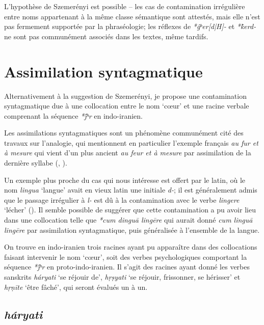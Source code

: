 \documentclass{article}
\newcommand{\ipa}[1]{{\phon\textit{#1}}}
\begin{document}
L'hypothèse de Szemerényi est possible -- les cas de contamination irrégulière entre noms appartenant à la même classe sémantique sont attestés, mais elle n'est pas fermement supportée par la phraséologie; les réflexes de \ipa{*ĝʰer[d|H]-} et \ipa{*k̂erd-} ne sont pas communément associés dans les textes, même tardifs.

\section{Assimilation syntagmatique}
Alternativement à la suggestion de Szemerényi, je propose une contamination syntagmatique due à une collocation entre le nom `cœur' et une racine verbale comprenant la séquence \ipa{*j́ʰr} en indo-iranien. 

Les assimilations syntagmatiques sont un phénomène communément cité des travaux sur l'analogie, qui mentionnent en particulier l'exemple français \ipa{au fur et à mesure} qui vient d'un plus ancient \ipa{au feur et à mesure} par assimilation de la dernière syllabe (\citealt[16]{andersen80morpho}, \citealt[64]{fertig13analogy}). %

Un exemple plus proche du cas qui nous intéresse est offert par le latin, où le nom \ipa{lingua} `langue' avait en vieux latin une initiale \ipa{d-}; il est généralement admis que le passage irrégulier à \ipa{l-} est dû à la contamination avec le verbe \ipa{lingere} `lécher' (\citealt[304]{hock91principles}). Il semble possible de suggérer que cette contamination a pu avoir lieu dans une collocation telle que \ipa{*cum dinguā lingēre} qui aurait donné \ipa{cum linguā lingēre} par assimilation syntagmatique, puis généralisée à l'ensemble de la langue.
 
On trouve en indo-iranien trois racines ayant pu apparaître dans des collocations faisant intervenir le nom `cœur', soit des verbes psychologiques comportant la séquence \ipa{*j́ʰr} en proto-indo-iranien. Il s'agit des racines ayant donné les verbes sanskrits \ipa{háryati} `se réjouir de', \ipa{hṛṣyati} `se réjouir, frissonner, se hérisser' et \ipa{hṛṇīte} `être fâché', qui seront évalués un à un.

\subsection{\ipa{háryati}} \label{sec:haryati}
\end{document}
